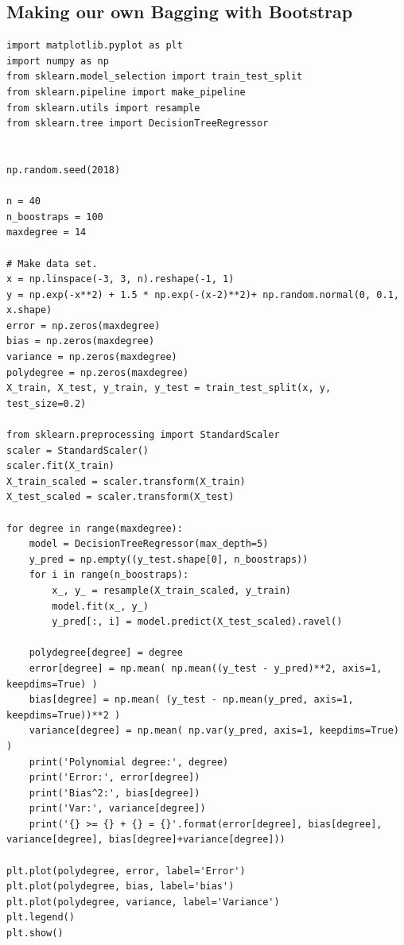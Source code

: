 \documentclass[%
oneside,                 %
final,                   %
10pt]{article}
\begin{document}
\subsection*{Making our own Bagging with Bootstrap}
\begin{verbatim}
import matplotlib.pyplot as plt
import numpy as np
from sklearn.model_selection import train_test_split
from sklearn.pipeline import make_pipeline
from sklearn.utils import resample
from sklearn.tree import DecisionTreeRegressor


np.random.seed(2018)

n = 40
n_boostraps = 100
maxdegree = 14

# Make data set.
x = np.linspace(-3, 3, n).reshape(-1, 1)
y = np.exp(-x**2) + 1.5 * np.exp(-(x-2)**2)+ np.random.normal(0, 0.1, x.shape)
error = np.zeros(maxdegree)
bias = np.zeros(maxdegree)
variance = np.zeros(maxdegree)
polydegree = np.zeros(maxdegree)
X_train, X_test, y_train, y_test = train_test_split(x, y, test_size=0.2)

from sklearn.preprocessing import StandardScaler
scaler = StandardScaler()
scaler.fit(X_train)
X_train_scaled = scaler.transform(X_train)
X_test_scaled = scaler.transform(X_test)

for degree in range(maxdegree):
    model = DecisionTreeRegressor(max_depth=5) 
    y_pred = np.empty((y_test.shape[0], n_boostraps))
    for i in range(n_boostraps):
        x_, y_ = resample(X_train_scaled, y_train)
        model.fit(x_, y_)
        y_pred[:, i] = model.predict(X_test_scaled).ravel()

    polydegree[degree] = degree
    error[degree] = np.mean( np.mean((y_test - y_pred)**2, axis=1, keepdims=True) )
    bias[degree] = np.mean( (y_test - np.mean(y_pred, axis=1, keepdims=True))**2 )
    variance[degree] = np.mean( np.var(y_pred, axis=1, keepdims=True) )
    print('Polynomial degree:', degree)
    print('Error:', error[degree])
    print('Bias^2:', bias[degree])
    print('Var:', variance[degree])
    print('{} >= {} + {} = {}'.format(error[degree], bias[degree], variance[degree], bias[degree]+variance[degree]))

plt.plot(polydegree, error, label='Error')
plt.plot(polydegree, bias, label='bias')
plt.plot(polydegree, variance, label='Variance')
plt.legend()
plt.show()

\end{verbatim}
\end{document}
